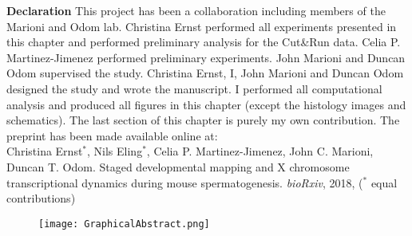 \vspace*{\fill}

\newpage

\vspace*{\fill}

\begin{Comment}
\textbf{Declaration} This project has been a collaboration including members of the Marioni and Odom lab. Christina Ernst performed all experiments presented in this chapter and performed preliminary analysis for the Cut\&{}Run data. Celia P. Martinez-Jimenez performed preliminary experiments. John Marioni and Duncan Odom supervised the study. Christina Ernst, I, John Marioni and Duncan Odom designed the study and wrote the manuscript. I performed all computational analysis and produced all figures in this chapter (except the histology images and schematics). The last section of this chapter is purely my own contribution. The preprint has been made available online at:\\

Christina Ernst$^\ast$, Nils Eling$^\ast$, Celia P. Martinez-Jimenez, John C. Marioni, Duncan T. Odom. Staged developmental mapping and X chromosome transcriptional dynamics during mouse spermatogenesis. \emph{bioRxiv}, 2018, ($^\ast$ equal contributions)
\end{Comment}

\vspace*{\fill}

\begin{figure}[hb]
\centering    
\texttt{[image: GraphicalAbstract.png]}
\caption*{}
\end{figure}

\vspace*{\fill}


\newpage


\newpage


